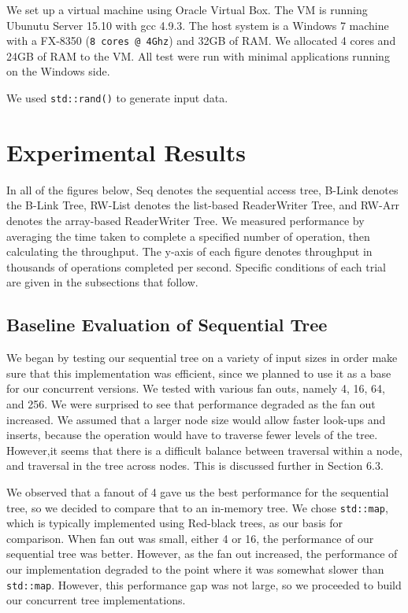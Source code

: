 \documentclass{sig-alternate}
\begin{document}
We set up a virtual machine using Oracle Virtual Box.  The VM is running Ubunutu Server 15.10 with gcc 4.9.3.  The host system is a Windows 7 machine with a FX-8350 (\texttt{8 cores @ 4Ghz}) and 32GB of RAM.  We allocated 4 cores and 24GB of RAM to the VM.  All test were run with minimal applications running on the Windows side.

We used \texttt{std::rand()} to generate input data.  


\section{Experimental Results}
In all of the figures below, Seq denotes the sequential access tree, B-Link denotes the B-Link Tree, RW-List denotes the list-based ReaderWriter Tree, and RW-Arr denotes the array-based ReaderWriter Tree. We measured performance by averaging the time taken to complete a specified number of operation, then calculating the throughput. The y-axis of each figure denotes throughput in thousands of operations completed per second. Specific conditions of each trial are given in the subsections that follow.

\subsection{Baseline Evaluation of Sequential Tree}
We began by testing our sequential tree on a variety of input sizes in order make sure that this implementation was efficient, since we planned to use it as a base for our concurrent versions.  We tested with various fan outs, namely 4, 16, 64, and 256.  We were surprised to see that performance degraded as the fan out increased.  We assumed that a larger node size would allow faster look-ups and inserts, because the operation would have to traverse fewer levels of the tree.  However,it seems that there is a difficult balance between traversal within a node, and traversal in the tree across nodes. This is discussed further in Section 6.3.

We observed that a fanout of 4 gave us the best performance for the sequential tree, so we decided to compare that to an in-memory tree.  We chose \texttt{std::map}, which is typically implemented using Red-black trees, as our basis for comparison.  When fan out was small, either 4 or 16, the performance of our sequential tree was better.  However, as the fan out increased, the performance of our implementation degraded to the point where it was somewhat slower than \texttt{std::map}. However, this performance gap was not large, so we proceeded to build our concurrent tree implementations.
\end{document}
